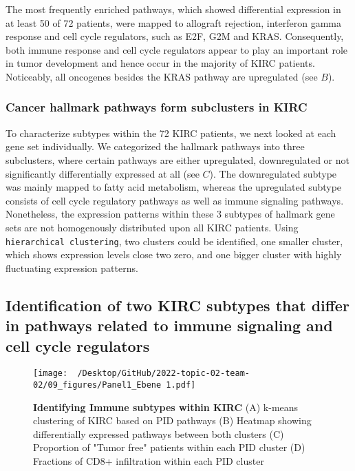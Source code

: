 \documentclass[
  parskip,
  openany]{scrreprt}
\begin{document}
The most frequently enriched pathways, which showed differential
expression in at least 50 of 72 patients, were mapped to allograft
rejection, interferon gamma response and cell cycle regulators, such as
E2F, G2M and KRAS. Consequently, both immune response and cell cycle
regulators appear to play an important role in tumor development and
hence occur in the majority of KIRC patients. Noticeably, all oncogenes
besides the KRAS pathway are upregulated (see  \(B\)).

\hypertarget{cancer-hallmark-pathways-form-subclusters-in-kirc}{%
\subsubsection{Cancer hallmark pathways form subclusters in
KIRC}\label{cancer-hallmark-pathways-form-subclusters-in-kirc}}

To characterize subtypes within the 72 KIRC patients, we next looked at
each gene set individually. We categorized the hallmark pathways into
three subclusters, where certain pathways are either upregulated,
downregulated or not significantly differentially expressed at all (see
 \(C\)). The downregulated subtype was mainly mapped to
fatty acid metabolism, whereas the upregulated subtype consists of cell
cycle regulatory pathways as well as immune signaling pathways.
Nonetheless, the expression patterns within these 3 subtypes of hallmark
gene sets are not homogenously distributed upon all KIRC patients. Using
\texttt{hierarchical\ clustering}, two clusters could be identified, one
smaller cluster, which shows expression levels close two zero, and one
bigger cluster with highly fluctuating expression patterns.

\hypertarget{identification-of-two-kirc-subtypes-that-differ-in-pathways-related-to-immune-signaling-and-cell-cycle-regulators}{%
\subsection{Identification of two KIRC subtypes that differ in pathways
related to immune signaling and cell cycle
regulators}\label{identification-of-two-kirc-subtypes-that-differ-in-pathways-related-to-immune-signaling-and-cell-cycle-regulators}}

\begin{figure}[h]
  \texttt{[image: ~/Desktop/GitHub/2022-topic-02-team-02/09\_figures/Panel1\_Ebene 1.pdf]}
  \caption{\textbf{Identifying Immune subtypes within KIRC }(A) k-means clustering of KIRC based on PID pathways (B) Heatmap showing differentially expressed pathways between both clusters (C) Proportion of "Tumor free" patients within each PID cluster (D) Fractions of CD8+ infiltration within each PID cluster}
  \label{pid}
\end{figure}
\end{document}
